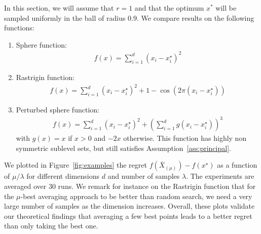 In this section, we will assume that $r=1$ and that the optimum $x^*$ will be sampled uniformly in the ball of radius $0.9$. We compare results on the following functions:
\begin{enumerate}
    \item Sphere function: 
    \begin{align*}
        f(x)=\sum_{i=1}^d (x_i-x_i^\star)^2
    \end{align*}
    \item Rastrigin function: 
    \begin{align*}
        f(x)=\sum_{i=1}^d (x_i-x_i^\star)^2 + 1-\cos{\left(2\pi (x_i-x_i^\star) \right)}
    \end{align*}
    \item Perturbed sphere function:
       \begin{align*}
        f(x)=\sum_{i=1}^d (x_i-x_i^\star)^2 +\left(\sum_{i=1}^d g(x_i-x_i^\star) \right)^3
    \end{align*}
    with $g(x) = x$ if $x>0$ and $-2x$ otherwise. This function has highly non symmetric sublevel sets, but still satisfies Assumption~\ref{ass:principal}.
\end{enumerate}

We plotted in Figure~\ref{fig:examples} the regret $f(\bar{X}_{(\mu)})-f(x^\star)$ as a function of $\mu/\lambda$ for different dimensions $d$ and number of samples $\lambda$. The experiments are averaged over $30$ runs. We remark for instance on the Rastrigin function that for the $\mu$-best averaging approach to be better than random search, we need a very large number of samples as the dimension increases. Overall, these plots validate our theoretical findings that averaging a few best points leads to a better regret than only taking the best one.


